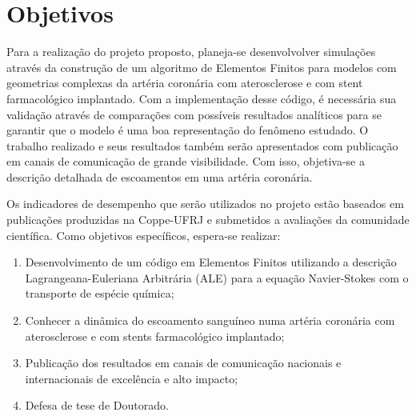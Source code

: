 \section{Objetivos}

Para a realização do projeto proposto, planeja-se desenvolvolver simulações através da construção de um algoritmo de Elementos Finitos para modelos com geometrias complexas da artéria coronária com aterosclerose e com stent farmacológico implantado. 
Com a implementação desse código, é necessária sua validação através de comparações com possíveis resultados analíticos para se garantir que o modelo é uma boa representação do fenômeno estudado. 
O trabalho realizado e seus resultados também serão apresentados com publicação em canais de comunicação de grande visibilidade. 
Com isso, objetiva-se a descrição detalhada de escoamentos em uma artéria coronária.

\medskip
Os indicadores de desempenho que serão utilizados no projeto estão baseados em publicações produzidas na Coppe-UFRJ e 
submetidos a avaliações da comunidade científica. 
Como objetivos específicos, espera-se realizar:

\begin{enumerate}
\item Desenvolvimento de um código em Elementos Finitos utilizando a descrição Lagrangeana-Euleriana Arbitrária (ALE) para a equação Navier-Stokes
com o transporte de espécie química;

\item Conhecer a dinâmica do escoamento sanguíneo numa artéria coronária com aterosclerose
e com stents farmacológico implantado;

\item Publicação dos resultados em canais de comunicação nacionais e internacionais de excelência e alto impacto;

\item Defesa de tese de Doutorado.

\end{enumerate}
